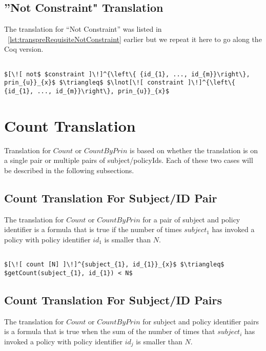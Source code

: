 \subsection{''Not Constraint" Translation}

The translation for ``Not Constraint'' was listed in ~\ref{lst:transpreRequisiteNotConstraint} earlier but we repeat it here to go along the Coq version. 

\lstset{mathescape, language=AST}  
\begin{lstlisting}[frame=single, caption={Not Constraint Translation},label={lst:transnotCons}]

$[\![ not$ $constraint ]\!]^{\left\{ {id_{1}, ..., id_{m}}\right\}, prin_{u}}_{x}$ $\triangleq$ $\lnot[\![ constraint ]\!]^{\left\{ {id_{1}, ..., id_{m}}\right\}, prin_{u}}_{x}$ 

\end{lstlisting}

\section{Count Translation}
Translation for $Count$ or $CountByPrin$ is based on whether the translation is on a single pair or multiple pairs of subject/policyIds. Each of these two cases will be described in the following subsections.

\subsection{Count Translation For Subject/ID Pair}
The translation for $Count$ or $CountByPrin$ for a pair of subject and policy identifier is a formula that is true if the number of times $subject_{1}$ has invoked a policy with policy identifier $id_{1}$ is smaller than $N$.

\lstset{mathescape, language=AST}  
\begin{lstlisting}[frame=single, caption={Count Translation {$\colon$} subject and policyId Pair},label={lst:transcountSinglePair}]

$[\![ count [N] ]\!]^{subject_{1}, id_{1}}_{x}$ $\triangleq$ $getCount(subject_{1}, id_{1}) < N$
\end{lstlisting}

\subsection{Count Translation For Subject/ID Pairs}
The translation for $Count$ or $CountByPrin$ for subject and policy identifier pairs is a formula that is true when the sum of the number of times that $subject_{i}$ has invoked a policy with policy identifier $id_{j}$ is smaller than $N$.

